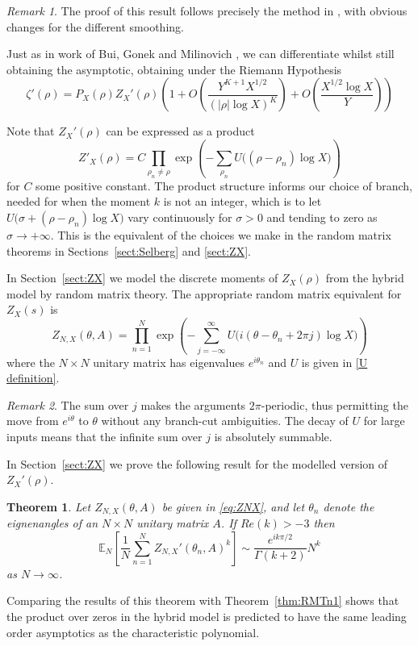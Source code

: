 \documentclass[12pt,a4paper,reqno]{amsart}
\newtheorem{theorem}{Theorem}
\theoremstyle{remark}
\newtheorem*{remark}{Remark}
\numberwithin{equation}{section}
\newcommand{\ii}{i}
\newcommand{\E}{\mathbb{E}}
\begin{document}
\begin{remark}
    The proof of this result follows precisely the method in \cite{GHK07}, with obvious changes for the different smoothing.
\end{remark}

Just as in work of Bui, Gonek and Milinovich \cite{BGM13}, we can differentiate whilst still obtaining the asymptotic,  obtaining under the Riemann Hypothesis
\begin{equation}\label{eq:HybridZetaPrimeRho}
\zeta'(\rho) =  P_X(\rho) Z_X'(\rho) \left(1+O\left(\frac{Y^{K+1} X^{1/2}}{(|\rho| \log X)^K} \right) + O\left(\frac{X^{1/2}\log X}{Y} \right) \right)
\end{equation}

Note that $Z_X'(\rho)$ can be expressed as a product
\[
Z'_X(\rho) = C \prod_{\rho_n\neq\rho} \exp\left(-\sum_{\rho_n}U\big((\rho-\rho_n)\log
    X\big)\right)
\]
for $C$ some positive constant. The product structure informs our choice of branch, needed for when the moment $k$ is not an integer, which is to let $U\big(\sigma+(\rho-\rho_n)\log X\big)$ vary continuously for $\sigma>0$ and tending to zero as $\sigma\to+\infty$. This is the equivalent of the choices we make in the random matrix theorems in Sections~\ref{sect:Selberg} and \ref{sect:ZX}.

In Section~\ref{sect:ZX} we model the discrete moments of $Z_X(\rho)$ from the hybrid model by random matrix theory. The appropriate random matrix equivalent for $Z_X(s)$ is
\begin{equation}\label{eq:ZNX}
   Z_{N,X}(\theta,A) = \prod_{n=1}^N\exp\left(-\sum_{j=-\infty}^\infty U\big(\ii(\theta-\theta_n + 2\pi j)\log X\big)\right)
\end{equation}
where the $N\times N$ unitary matrix has eigenvalues $e^{i\theta_n}$ and $U$ is given in \eqref{U definition}.

\begin{remark}
    The sum over $j$ makes the arguments $2\pi$-periodic, thus permitting the move from $e^{i\theta}$ to $\theta$ without any branch-cut ambiguities. The decay of $U$ for large inputs means that the infinite sum over $j$ is absolutely summable.
\end{remark}



In Section~\ref{sect:ZX} we prove the following result for the modelled version of $Z_X'(\rho)$. 
\begin{theorem} \label{thm:Z_X}
    Let $Z_{N,X}(\theta,A)$ be given in \eqref{eq:ZNX}, and let $\theta_n$ denote the eignenangles of an $N\times N$ unitary matrix $A$. If $Re(k) >-3$ then
    \[
    \E_N\left[\frac{1}{N} \sum_{n=1}^N Z_{N,X}'(\theta_n,A)^k\right] \sim  \frac{e^{\ii k \pi/2}}{\Gamma(k+2)} N^k
    \]
    as $N\to \infty$.
\end{theorem}
Comparing the results of this theorem with Theorem~\ref{thm:RMTn1} shows that the product over zeros in the hybrid model is predicted to  have the same leading order asymptotics as the characteristic polynomial. 
\end{document}
